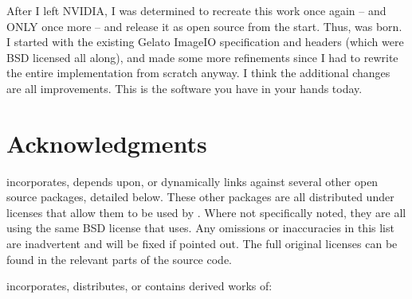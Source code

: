 After I left NVIDIA, I was determined to recreate this work once
again -- and ONLY once more -- and release it as open source from the
start.  Thus, \product was born.  I started with the existing Gelato
ImageIO specification and headers (which were BSD licensed all along),
and made some more refinements since I had to rewrite the entire
implementation from scratch anyway.  I think the additional changes are
all improvements.  This is the software you have in your hands today.


\section{Acknowledgments}

\begin{comment}
The direct precursor to \product was Gelato's ImageIO, which was
co-designed and implemented by Larry Gritz, Dan Wexler, Jonathan Rice, Eric
Enderton, and Philip Nemec.

Big thanks to our bosses at NVIDIA for allowing us to share the API spec
and headers under the BSD license.  And thanks to their inability to
open source their own implementation in a timely manner, I was forced to
create this clearly superior descendant.
\end{comment}

\product incorporates, depends upon, or dynamically links against several
other open source packages, detailed below. These other packages are all
distributed under licenses that allow them to be used by \product. Where not
specifically noted, they are all using the same BSD license that \product
uses. Any omissions or inaccuracies in this list are inadvertent and will be
fixed if pointed out. The full original licenses can be found in the
relevant parts of the source code.

\smallskip
\noindent \product incorporates, distributes, or contains derived works of:

